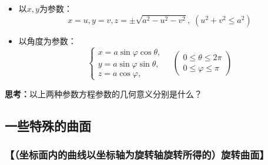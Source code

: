 \begin{itemize}
  \item {以$x,y$为参数：} 
  $${x=u,y=v,z=\pm\sqrt{a^2-u^2-v^2},\;(u^2+v^2\leq a^2)}$$
  \vspace{-2em} 
  \item {以角度为参数：} 
  $${\left\{\begin{array}{l}
  	x=a\sin\varphi\cos\theta,\\
  	y=a\sin\varphi\sin\theta,\\
  	z=a\cos\varphi,
  \end{array}\right.
  \quad\left(\begin{array}{c}
  	0\leq\theta\leq 2\pi\\
  	0\leq\varphi\leq\pi
  \end{array}\right)}$$
\end{itemize}

{\bf 思考：}以上两种参数方程参数的几何意义分别是什么？

\begin{center}
\end{center}

\subsection{一些特殊的曲面}

\subsubsection{【（坐标面内的曲线以坐标轴为旋转轴旋转所得的）旋转曲面】}

